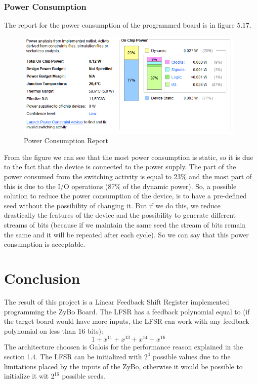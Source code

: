 \documentclass[a4paper]{report}
\begin{document}
\subsection{Power Consumption}
The report for the power consumption of the programmed board is in figure 5.17.
\begin{figure}[htpb]
	\centering
	\includegraphics[scale=0.85]{img/vivado/power.png}
	\caption{Power Consumption Report}
\end{figure}

\noindent From the figure we can see that the most power consumption is static, so it is due to the fact that the device is connected to the power supply. The part of the power consumed from the switching activity is equal to 23\% and the most part of this is due to the I/O operations (87\% of the dynamic power). So, a possible solution to reduce the power consumption of the device, is to have a pre-defined seed without the possibility of changing it. But if we do this, we reduce drastically the features of the device and the possibility to generate different streams of bits (because if we maintain the same seed the stream of bits remain the same and it will be repeated after each cycle). So we can say that this power consumption is acceptable.
 
\chapter{Conclusion}
The result of this project is a Linear Feedback Shift Register implemented programming the ZyBo Board. The LFSR has a feedback polynomial equal to (if the target board would have more inputs, the LFSR can work with any feedback polynomial on less than 16 bits):
\[1+x^{11}+x^{13}+x^{14}+x^{16}\]
The architecture choosen is Galois for the performance reason explained in the section 1.4.
The LFSR can be initialized with $2^4$ possible values due to the limitations placed by the inputs of the ZyBo, otherwise it would be possible to initialize it wit $2^{16}$ possible seeds.
\end{document}
